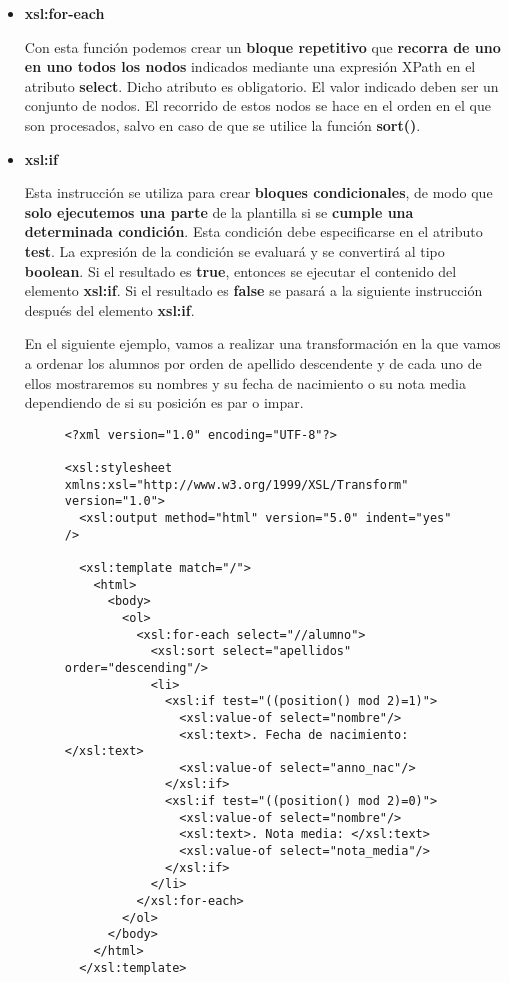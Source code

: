 \begin{itemize}
    \item \textbf{xsl:for-each}

    Con esta función podemos crear un \textbf{bloque repetitivo} que \textbf{recorra de uno en uno todos los nodos} indicados mediante una expresión XPath en el atributo \textbf{select}. Dicho atributo es obligatorio. El valor indicado deben ser un conjunto de nodos. El recorrido de estos nodos se hace en el orden en el que son procesados, salvo en caso de que se utilice la función \textbf{sort()}.

    \item \textbf{xsl:if}

    Esta instrucción se utiliza para crear \textbf{bloques condicionales}, de modo que \textbf{solo ejecutemos una parte} de la plantilla si se \textbf{cumple una determinada condición}. Esta condición debe especificarse en el atributo \textbf{test}. La expresión de la condición se evaluará y se convertirá al tipo \textbf{boolean}. Si el resultado es \textbf{true}, entonces se ejecutar el contenido del elemento \textbf{xsl:if}. Si el resultado es \textbf{false} se pasará a la siguiente instrucción después del elemento \textbf{xsl:if}.

    En el siguiente ejemplo, vamos a realizar una transformación en la que vamos a ordenar los alumnos por orden de apellido descendente y de cada uno de ellos mostraremos su nombres y su fecha de nacimiento o su nota media dependiendo de si su posición es par o impar.

    \begin{figure}[H]
        \begin{tcolorbox}[sharp corners, colback=yellow!30, colframe=white!20]
            \tiny
\begin{verbatim}
<?xml version="1.0" encoding="UTF-8"?>

<xsl:stylesheet xmlns:xsl="http://www.w3.org/1999/XSL/Transform" version="1.0">
  <xsl:output method="html" version="5.0" indent="yes" />

  <xsl:template match="/">
    <html>
      <body>
        <ol>
          <xsl:for-each select="//alumno">
            <xsl:sort select="apellidos" order="descending"/>
            <li>
              <xsl:if test="((position() mod 2)=1)">
                <xsl:value-of select="nombre"/>
                <xsl:text>. Fecha de nacimiento: </xsl:text>
                <xsl:value-of select="anno_nac"/>
              </xsl:if>
              <xsl:if test="((position() mod 2)=0)">
                <xsl:value-of select="nombre"/>
                <xsl:text>. Nota media: </xsl:text>
                <xsl:value-of select="nota_media"/>
              </xsl:if>
            </li>
          </xsl:for-each>
        </ol>
      </body>
    </html>
  </xsl:template>


\end{verbatim}
\end{tcolorbox}
\end{figure}
\end{itemize}
